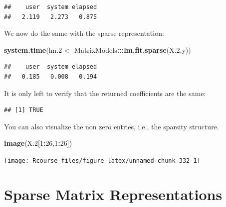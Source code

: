 \documentclass[]{book}
\newenvironment{Shaded}{\begin{snugshade}}{\end{snugshade}}
\newcommand{\DataTypeTok}[1]{\textcolor[rgb]{0.13,0.29,0.53}{#1}}
\newcommand{\DecValTok}[1]{\textcolor[rgb]{0.00,0.00,0.81}{#1}}
\newcommand{\FloatTok}[1]{\textcolor[rgb]{0.00,0.00,0.81}{#1}}
\newcommand{\KeywordTok}[1]{\textcolor[rgb]{0.13,0.29,0.53}{\textbf{#1}}}
\newcommand{\NormalTok}[1]{#1}
\newcommand{\OperatorTok}[1]{\textcolor[rgb]{0.81,0.36,0.00}{\textbf{#1}}}
\newcommand{\StringTok}[1]{\textcolor[rgb]{0.31,0.60,0.02}{#1}}
\theoremstyle{definition}
\theoremstyle{definition}
\theoremstyle{definition}
\theoremstyle{remark}
\begin{document}
\begin{verbatim}
##    user  system elapsed 
##   2.119   2.273   0.875
\end{verbatim}

We now do the same with the sparse representation:

\begin{Shaded}
\begin{Highlighting}[]
\KeywordTok{system.time}\NormalTok{(lm}\FloatTok{.2}\NormalTok{ <-}\StringTok{ }\NormalTok{MatrixModels}\OperatorTok{:::}\KeywordTok{lm.fit.sparse}\NormalTok{(X}\FloatTok{.2}\NormalTok{,y))}
\end{Highlighting}
\end{Shaded}

\begin{verbatim}
##    user  system elapsed 
##   0.185   0.008   0.194
\end{verbatim}

It is only left to verify that the returned coefficients are the same:

\begin{Shaded}
\end{Shaded}

\begin{verbatim}
## [1] TRUE
\end{verbatim}

You can also visualize the non zero entries, i.e., the sparsity structure.

\begin{Shaded}
\begin{Highlighting}[]
\KeywordTok{image}\NormalTok{(X}\FloatTok{.2}\NormalTok{[}\DecValTok{1}\OperatorTok{:}\DecValTok{26}\NormalTok{,}\DecValTok{1}\OperatorTok{:}\DecValTok{26}\NormalTok{])}
\end{Highlighting}
\end{Shaded}

\texttt{[image: Rcourse\_files/figure-latex/unnamed-chunk-332-1]}

\hypertarget{sparse-matrix-representations}{%
\section{Sparse Matrix Representations}\label{sparse-matrix-representations}}
\end{document}
